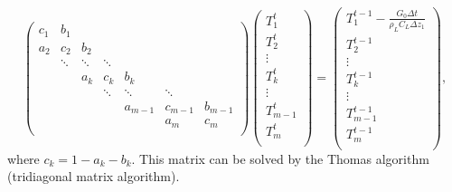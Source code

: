 \begin{equation}
\begin{pmatrix}
  c_{1}  & b_{1}  &        &        &         &         &         \\
  a_{2}  & c_{2}  & b_{2}  &        &         &         &         \\
         & \ddots & \ddots & \ddots &         &         &         \\
         &        & a_{k}  & c_{k}  & b_{k}   &         &         \\
         &        &        & \ddots & \ddots  & \ddots  &         \\
         &        &        &        & a_{m-1} & c_{m-1} & b_{m-1} \\
         &        &        &        &         & a_{m}   & c_{m}   \\
\end{pmatrix}
\begin{pmatrix}
  T_{1}^{t}   \\
  T_{2}^{t}   \\
  \vdots      \\
  T_{k}^{t}   \\
  \vdots      \\
  T_{m-1}^{t} \\
  T_{m}^{t}   \\
\end{pmatrix}
=
\begin{pmatrix}
  T_{1}^{t-1} - \frac{G_{0}\Delta t}{\rho_{L}C_{L}\Delta z_{1}} \\
  T_{2}^{t-1}   \\
  \vdots        \\
  T_{k}^{t-1}   \\
  \vdots        \\
  T_{m-1}^{t-1} \\
  T_{m}^{t-1}   \\
\end{pmatrix}
,
\end{equation}
where $c_{k} = 1 - a_{k} - b_{k}$.
This matrix can be solved by the Thomas algorithm (tridiagonal matrix algorithm).

